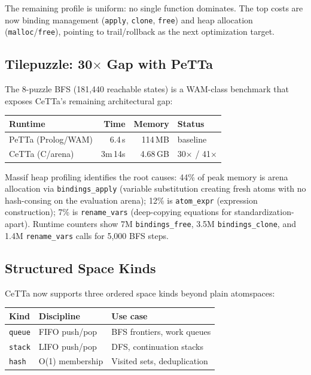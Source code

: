 \documentclass[11pt]{article}
\newcommand{\code}[1]{\texttt{#1}}
\newcommand{\PeTTa}{\textup{PeTTa}}
\newcommand{\CeTTa}{\textup{CeTTa}}
\begin{document}
The remaining profile is uniform: no single function dominates.
The top costs are now binding management (\code{apply}, \code{clone},
\code{free}) and heap allocation (\code{malloc}/\code{free}), pointing
to trail/rollback as the next optimization target.

\subsection{Tilepuzzle: 30$\times$ Gap with PeTTa}

The 8-puzzle BFS (181{,}440 reachable states) is a WAM-class benchmark
that exposes \CeTTa{}'s remaining architectural gap:

\begin{center}
\begin{tabular}{lrrl}
\toprule
Runtime & Time & Memory & Status \\
\midrule
\PeTTa{} (Prolog/WAM) & 6.4\,s & 114\,MB & baseline \\
\CeTTa{} (C/arena) & 3m\,14s & 4.68\,GB & 30$\times$ / 41$\times$ \\
\bottomrule
\end{tabular}
\end{center}

Massif heap profiling identifies the root causes:
44\% of peak memory is arena allocation via \code{bindings\_apply}
(variable substitution creating fresh atoms with no hash-consing on
the evaluation arena); 12\% is \code{atom\_expr} (expression
construction); 7\% is \code{rename\_vars} (deep-copying equations
for standardization-apart).  Runtime counters show 7M
\code{bindings\_free}, 3.5M \code{bindings\_clone}, and 1.4M
\code{rename\_vars} calls for 5{,}000 BFS steps.

\subsection{Structured Space Kinds}

\CeTTa{} now supports three ordered space kinds beyond plain atomspaces:

\begin{center}
\begin{tabular}{lll}
\toprule
Kind & Discipline & Use case \\
\midrule
\code{queue} & FIFO push/pop & BFS frontiers, work queues \\
\code{stack} & LIFO push/pop & DFS, continuation stacks \\
\code{hash} & O(1) membership & Visited sets, deduplication \\
\bottomrule
\end{tabular}
\end{center}
\end{document}
